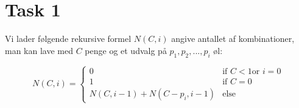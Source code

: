 \section{Task 1}

Vi lader følgende rekursive formel $N(C, i)$ angive antallet af kombinationer, man kan lave med $C$ penge og et udvalg på $p_1, p_2, ..., p_i$ øl:

$$N(C, i) = \begin{cases} 0 & \text{if } C < 1 \text{or } i = 0 \\
  1 & \text{if } C = 0 \\
  N(C, i-1) + N(C-p_i, i-1) & \text{else }
\end{cases}
$$
